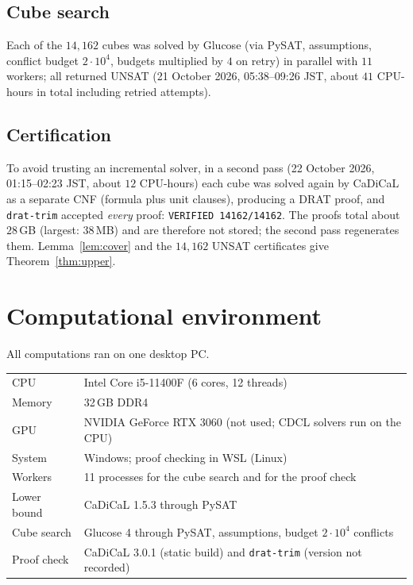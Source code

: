 \documentclass[11pt,a4paper]{article}
\theoremstyle{remark}
\begin{document}
\subsection{Cube search}
Each of the $14{,}162$ cubes was solved by Glucose (via PySAT, assumptions, conflict budget $2\cdot10^4$, budgets multiplied by $4$ on retry)
in parallel with $11$ workers; all returned UNSAT (21 October 2026, 05:38--09:26 JST, about $41$ CPU-hours in total including retried attempts).

\subsection{Certification}
To avoid trusting an incremental solver, in a second pass (22 October 2026, 01:15--02:23 JST, about $12$ CPU-hours) each cube
was solved again by CaDiCaL as a separate CNF (formula plus unit clauses), producing a DRAT proof, and
\texttt{drat-trim} \cite{WHH14} accepted \emph{every} proof: \texttt{VERIFIED 14162/14162}.
The proofs total about $28$\,GB (largest: $38$\,MB) and are therefore not stored; the second pass regenerates them.
Lemma~\ref{lem:cover} and the $14{,}162$ UNSAT certificates give Theorem~\ref{thm:upper}.

\section{Computational environment}
All computations ran on one desktop PC.
\begin{center}
\begin{tabular}{@{}ll@{}}
\toprule
CPU & Intel Core i5-11400F (6 cores, 12 threads) \\
Memory & 32\,GB DDR4 \\
GPU & NVIDIA GeForce RTX 3060 (not used; CDCL solvers run on the CPU) \\
System & Windows; proof checking in WSL (Linux) \\
Workers & 11 processes for the cube search and for the proof check \\
Lower bound & CaDiCaL 1.5.3 through PySAT \\
Cube search & Glucose 4 through PySAT, assumptions, budget $2\cdot10^4$ conflicts \\
Proof check & CaDiCaL 3.0.1 (static build) and \texttt{drat-trim} (version not recorded) \\
\bottomrule
\end{tabular}
\end{center}
\end{document}
